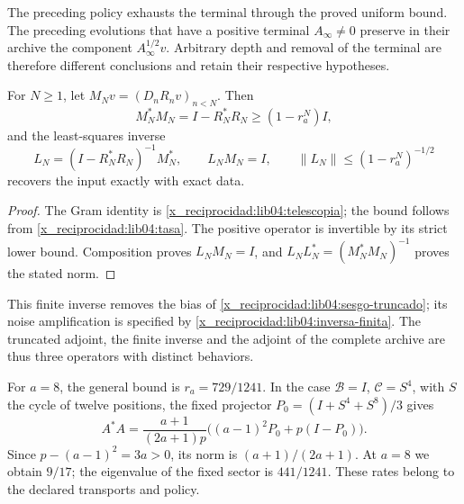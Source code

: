 The preceding policy exhausts the terminal through the proved uniform bound.
The preceding evolutions that have a positive terminal
\(A_\infty\neq0\) preserve in their archive the component
\(A_\infty^{1/2}v\). Arbitrary depth and removal of the
terminal are therefore different conclusions and retain their
respective hypotheses.

\begin{proposition}
\label{x_reciprocidad:lib04:prop-inversa-finita}
For \(N\geq1\), let \(M_Nv=(D_nR_nv)_{n<N}\). Then
\begin{equation}
 M_N^*M_N=I-R_N^*R_N\geq(1-r_a^N)I,
 \label{x_reciprocidad:lib04:gram-finito}
\end{equation}
and the least-squares inverse
\begin{equation}
 L_N=(I-R_N^*R_N)^{-1}M_N^*,\qquad
 L_NM_N=I,\qquad
 \|L_N\|\leq(1-r_a^N)^{-1/2}
 \label{x_reciprocidad:lib04:inversa-finita}
\end{equation}
recovers the input exactly with exact data.
\end{proposition}

\begin{proof}
The Gram identity is \eqref{x_reciprocidad:lib04:telescopia}; the bound follows from
\eqref{x_reciprocidad:lib04:tasa}. The positive operator is invertible by its strict
lower bound. Composition proves \(L_NM_N=I\), and
\(L_NL_N^*=(M_N^*M_N)^{-1}\) proves the stated norm.
\end{proof}

This finite inverse removes the bias of
\eqref{x_reciprocidad:lib04:sesgo-truncado}; its noise amplification is
specified by \eqref{x_reciprocidad:lib04:inversa-finita}. The truncated adjoint,
the finite inverse and the adjoint of the complete archive are thus three
operators with distinct behaviors.

For \(a=8\), the general bound is \(r_a=729/1241\). In the case
\(\mathcal B=I\), \(\mathcal C=S^4\), with \(S\) the cycle of
twelve positions, the fixed projector
\(P_0=(I+S^4+S^8)/3\) gives
\begin{equation}
 A^*A=\frac{a+1}{(2a+1)p}
       \bigl((a-1)^2P_0+p(I-P_0)\bigr).
 \label{x_reciprocidad:lib04:gram-tasa-ternaria}
\end{equation}
Since \(p-(a-1)^2=3a>0\), its norm is
\((a+1)/(2a+1)\). At \(a=8\) we obtain \(9/17\); the eigenvalue
of the fixed sector is \(441/1241\). These rates belong to the
declared transports and policy.

